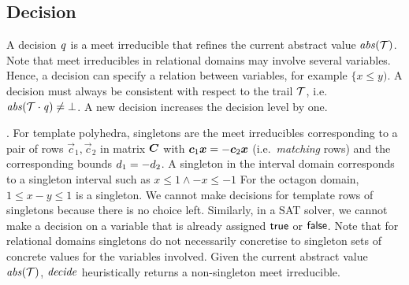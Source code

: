 \subsection{Decision}
A decision $\mathit{q}$ is a meet irreducible that refines the
current abstract value $\mathit{abs}(\mathcal{T})$.  Note that meet irreducibles in
relational domains may involve several variables.
%
%
Hence, a decision can specify a relation between variables, for example 
$\{x \leq y)$.  A decision must always be consistent with respect to 
the trail $\mathcal{T}$, i.e.\ $\mathit{abs}(\mathcal{T}\cdot \mathit{q})\neq \bot$.  
A new decision increases the decision level by one. 

.
%
For template polyhedra, singletons are the meet irreducibles
corresponding to a pair of rows $\vec{c}_1,\vec{c}_2$ in matrix
${\boldsymbol C}$ with ${\boldsymbol c}_1{\boldsymbol {x}}=-{\boldsymbol c}_2{\boldsymbol {x}}$
(i.e.\ \emph{matching} rows) and the corresponding bounds
$d_1=-d_2$.
%
A singleton in the interval domain corresponds to a singleton interval
such as $x\leq 1 \wedge -x\leq -1$ For the octagon domain, $1 \leq x-y
\leq 1$ is a singleton.
%
We cannot make decisions for template rows of singletons because there
is no choice left. Similarly, in a SAT solver, we cannot make a
decision on a variable that is already assigned $\mathsf{true}$ or $\mathsf{false}$.
%
Note that for relational domains singletons do not necessarily
concretise to singleton sets of concrete values for the variables
involved.
%
Given 
the current abstract value $\mathit{abs}(\mathcal{T})$, $\mathit{decide}$ heuristically
returns a non-singleton meet irreducible.

